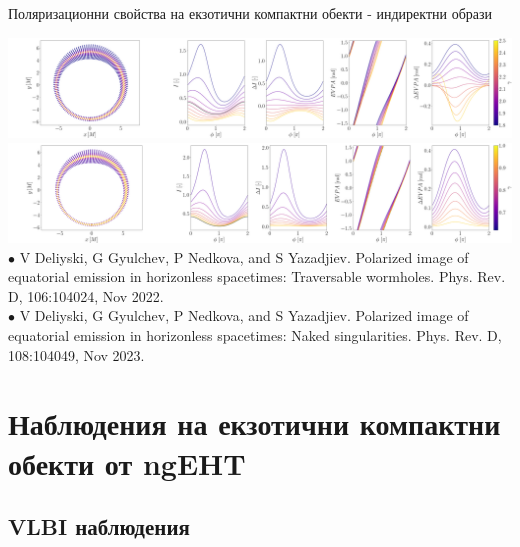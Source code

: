 \documentclass[hyperref={colorlinks,citecolor=blue,linkcolor=blue,urlcolor=blue}]{beamer}
\begin{document}
	\begin{frame}{Поляризационни свойства на екзотични компактни обекти - индиректни образи}
		
		\centering
		\includegraphics[scale = 0.12]{Section_7_Polarized_Emission/WH_delta_fig_B_0.5_0.87_0_20_deg_r6_n1.png}
		\includegraphics[scale = 0.12]{Section_7_Polarized_Emission/JNW_delta_fig_B_0.5_0.87_0_20_deg_r6_n1.png}\\
		
			
		\tiny  $\bullet$ V Deliyski, G Gyulchev, P Nedkova, and S Yazadjiev.
		Polarized image of equatorial emission in horizonless spacetimes: Traversable
		wormholes. Phys. Rev. D, 106:104024, Nov 2022.\\
		$\bullet$ V Deliyski, G Gyulchev, P Nedkova, and S Yazadjiev.
		Polarized image of equatorial emission in horizonless spacetimes: Naked
		singularities. Phys. Rev. D, 108:104049, Nov 2023.
		
	\end{frame}

	
	\section{Наблюдения на екзотични компактни обекти от ngEHT}
	
	\subsection{VLBI наблюдения}
	
\end{document}
